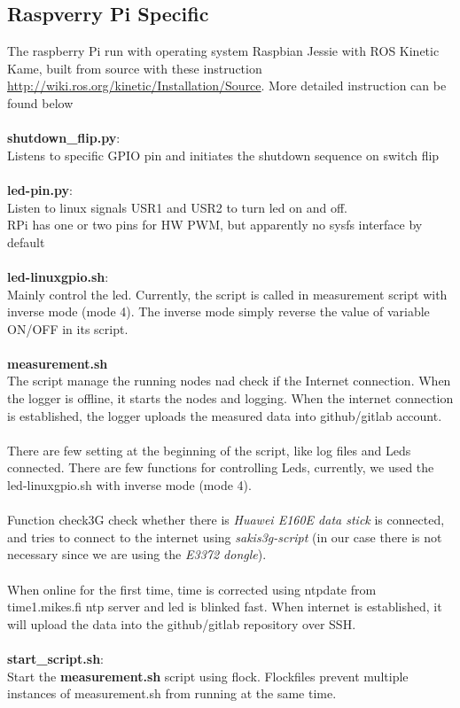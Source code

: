 \documentclass{report}
\begin{document}
\subsection{Raspverry Pi Specific}
The raspberry Pi run with operating system Raspbian Jessie with ROS Kinetic Kame, built from source with these instruction \url{http://wiki.ros.org/kinetic/Installation/Source}. More detailed instruction can be found below
\\
\\\textbf{shutdown\_flip.py}:
\\Listens to specific GPIO pin and initiates the shutdown sequence on switch flip
\\
\\\textbf{led-pin.py}:
\\Listen to linux signals USR1 and USR2 to turn led on and off.
\\RPi has one or two pins for HW PWM, but apparently no sysfs interface by default
\\
\\\textbf{led-linuxgpio.sh}:
\\Mainly control the led. Currently, the script is called in measurement script with inverse mode (mode 4). The inverse mode simply reverse the value of variable ON/OFF in its script.
\\
\\\textbf{measurement.sh}
\\The script manage the running nodes nad check if the Internet connection. When the logger is offline, it starts the nodes and logging. When the internet connection is established, the logger uploads the measured data into github/gitlab account.
\\
\\ There are few setting at the beginning of the script, like log files and Leds connected. There are few functions for controlling Leds, currently, we used the led-linuxgpio.sh with inverse mode (mode 4).
\\
\\Function check3G check whether there is \textit{Huawei E160E data stick} is connected, and tries to connect to the internet using \textit{sakis3g-script} (in our case there is not necessary since we are using the \textit{E3372 dongle}).
\\
\\When online for the first time, time is corrected using ntpdate from time1.mikes.fi ntp server and led is blinked fast. When internet is established, it will upload the data into the github/gitlab repository over SSH.
\\
\\\textbf{start\_script.sh}:
\\Start the \textbf{measurement.sh} script using flock. Flockfiles prevent multiple instances of measurement.sh from running at the same time. 
\end{document}
